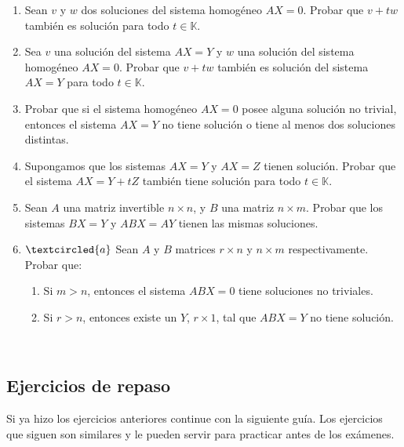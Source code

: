 \documentclass[12pt]{amsart}
\begin{document}
\begin{enumerate}[topsep=6pt,itemsep=6pt]
\item\label{sol homog es subesp} Sean  $v$ y $w$ dos soluciones del sistema homog\'eneo $AX=0$. Probar que $v+tw$ tambi\'en es soluci\'on para todo $t\in\mathbb{K}$.

\item Sea $v$ una soluci\'on del sistema $AX=Y$ y $w$ una soluci\'on del sistema homog\'eneo $AX=0$. Probar que $v+tw$ tambi\'en es soluci\'on del sistema $AX=Y$ para todo $t\in\mathbb{K}$.

\item Probar que si el sistema homog\'eneo  $AX=0$ posee alguna soluci\'on no trivial, entonces el sistema $AX=Y$ no tiene
soluci\'on o tiene al menos dos soluciones distintas.

\item Supongamos que los sistemas $AX=Y$ y $AX=Z$ tienen soluci\'on. Probar que el sistema $AX=Y+tZ$ tambi\'en tiene soluci\'on para todo $t\in\mathbb{K}$.

\item Sean $A$ una matriz invertible $n\times n$, y $B$ una matriz $n\times m$.  Probar que los sistemas $BX=Y$ y $ABX=AY$ tienen las mismas soluciones.

\item\label{ej:sistemas ABX} $\textcircled{a}$
Sean $A$ y $B$ matrices $r\times n$ y $n\times m$ respectivamente.
Probar que:
\begin{enumerate}[topsep=5pt,itemsep=5pt]
	\item  Si $m>n$, entonces el sistema $ABX=0$ tiene soluciones no triviales.
	\item  Si $r>n$, entonces existe un $Y$, $r\times 1$, tal que $ABX=Y$
	no tiene soluci\'on.
\end{enumerate}


\end{enumerate}


\

\subsection*{Ejercicios de repaso}
Si ya hizo los ejercicios anteriores continue con la siguiente gu\'ia. Los ejercicios que siguen son similares y le pueden servir para practicar antes de los ex\'amenes.

\
\end{document}
